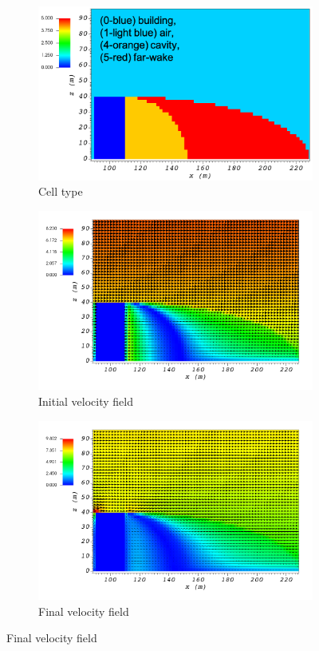 \documentclass[14pt,landscape]{report}
\begin{document}
\begin{figure}[p]
    \centering
    \begin{subfigure}[t]{0.45\textwidth}
    \centering
    \includegraphics[width=10.3cm,keepaspectratio]{Images/wake_y_100_1_init_icell.png}
    \caption{Cell type}
    \end{subfigure}
    \begin{subfigure}[t]{0.45\textwidth}
    \centering
    \includegraphics[width=11.0cm,keepaspectratio]{Images/wake_y_100_1_init_vel.png}
    \caption{Initial velocity field}
    \end{subfigure}
    \begin{subfigure}[t]{0.45\textwidth}
    \centering
    \includegraphics[width=11.0cm,keepaspectratio]{Images/wake_y_100_1_final.png}
    \caption{Final velocity field}
    \end{subfigure}
\end{figure}
\end{document}

